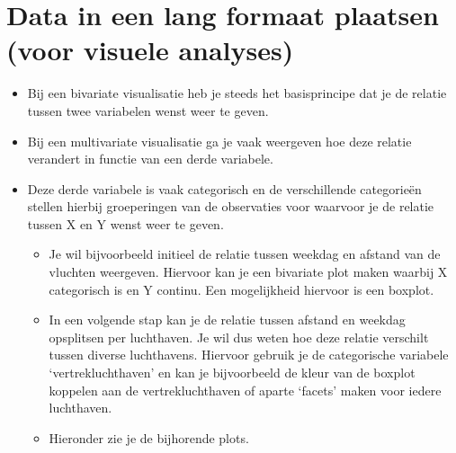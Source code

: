 \documentclass[]{tufte-book}
\newenvironment{Shaded}{}{}
\newcommand{\DataTypeTok}[1]{\textcolor[rgb]{0.56,0.13,0.00}{#1}}
\newcommand{\KeywordTok}[1]{\textcolor[rgb]{0.00,0.44,0.13}{\textbf{#1}}}
\newcommand{\NormalTok}[1]{#1}
\newcommand{\OperatorTok}[1]{\textcolor[rgb]{0.40,0.40,0.40}{#1}}
\newcommand{\StringTok}[1]{\textcolor[rgb]{0.25,0.44,0.63}{#1}}
\providecommand{\tightlist}{%
  \setlength{\itemsep}{0pt}\setlength{\parskip}{0pt}}
\begin{document}
\hypertarget{data-in-een-lang-formaat-plaatsen-voor-visuele-analyses}{%
\section{Data in een lang formaat plaatsen (voor visuele analyses)}\label{data-in-een-lang-formaat-plaatsen-voor-visuele-analyses}}

\begin{itemize}
\tightlist
\item
  Bij een bivariate visualisatie heb je steeds het basisprincipe dat je de relatie tussen twee variabelen wenst weer te geven.
\item
  Bij een multivariate visualisatie ga je vaak weergeven hoe deze relatie verandert in functie van een derde variabele.
\item
  Deze derde variabele is vaak categorisch en de verschillende categorieën stellen hierbij groeperingen van de observaties voor waarvoor je de relatie tussen X en Y wenst weer te geven.

  \begin{itemize}
  \tightlist
  \item
    Je wil bijvoorbeeld initieel de relatie tussen weekdag en afstand van de vluchten weergeven. Hiervoor kan je een bivariate plot maken waarbij X categorisch is en Y continu. Een mogelijkheid hiervoor is een boxplot.
  \item
    In een volgende stap kan je de relatie tussen afstand en weekdag opsplitsen per luchthaven. Je wil dus weten hoe deze relatie verschilt tussen diverse luchthavens. Hiervoor gebruik je de categorische variabele `vertrekluchthaven' en kan je bijvoorbeeld de kleur van de boxplot koppelen aan de vertrekluchthaven of aparte `facets' maken voor iedere luchthaven.
  \item
    Hieronder zie je de bijhorende plots.
  \end{itemize}
\end{itemize}

\begin{Shaded}
\end{Shaded}
\end{document}
